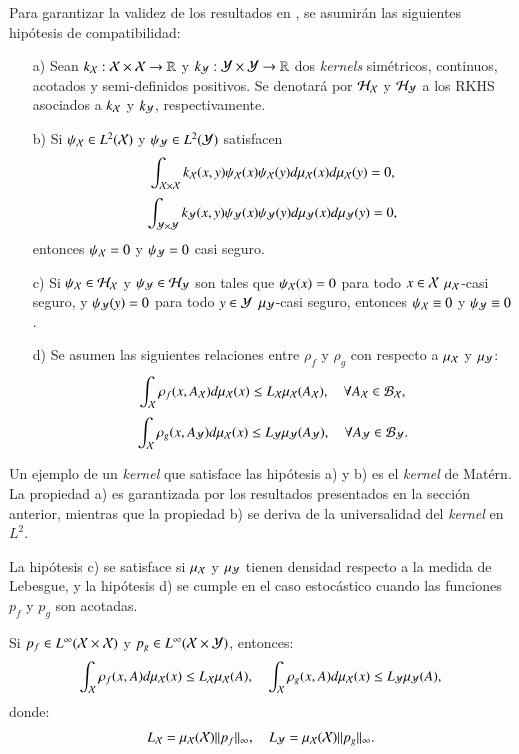 Para garantizar la validez de los resultados en \cite{Philipp2024ErrorOperator}, se asumirán las siguientes hipótesis de compatibilidad:
\begin{enumerate}
    \item[a)] Sean $k_{\mathcal{X}}:\mathcal{X} \times \mathcal{X} \to \mathbb{R}$ y $k_{\mathcal{Y}}: \mathcal{Y} \times \mathcal{Y} \to \mathbb{R}$ dos \textit{kernels} simétricos, continuos, acotados y semi-definidos positivos. Se denotará por $\mathcal{H}_{\mathcal{X}}$ y $\mathcal{H}_{\mathcal{Y}}$ a los RKHS asociados a $k_{\mathcal{X}}$ y $k_{\mathcal{Y}}$, respectivamente.
    
    \item[b)] Si $\psi_{\mathcal{X}} \in L^2(\mathcal{X})$ y $\psi_{\mathcal{Y}} \in L^2(\mathcal{Y})$ satisfacen  
    \[
        \int_{\mathcal{X} \times \mathcal{X}} k_{\mathcal{X}}(x,y) \psi_{\mathcal{X}} (x) \psi_{\mathcal{X}} (y) d \mu_{\mathcal{X}} (x) d \mu_{\mathcal{X}} (y) = 0, 
    \]
    \[
        \int_{\mathcal{Y} \times \mathcal{Y}} k_{\mathcal{Y}}(x,y) \psi_{\mathcal{Y}} (x) \psi_{\mathcal{Y}} (y) d \mu_{\mathcal{Y}} (x) d \mu_{\mathcal{Y}} (y) = 0, 
    \]
    entonces $\psi_{\mathcal{X}} = 0$ y $\psi_{\mathcal{Y}} = 0$ casi seguro.
    
    \item[c)] Si $\psi_{\mathcal{X}} \in \mathcal{H}_{\mathcal{X}}$ y $\psi_{\mathcal{Y}} \in \mathcal{H}_{\mathcal{Y}}$ son tales que $\psi_{\mathcal{X}}(x) = 0$ para todo $x \in \mathcal{X}$ $\mu_{\mathcal{X}}$-casi seguro, y $\psi_{\mathcal{Y}}(y) = 0$ para todo $y \in \mathcal{Y}$ $\mu_{\mathcal{Y}}$-casi seguro, entonces $\psi_{\mathcal{X}} \equiv 0$ y $\psi_{\mathcal{Y}} \equiv 0$.
    
    \item[d)] Se asumen las siguientes relaciones entre $\rho_f$ y $\rho_g$ con respecto a $\mu_{\mathcal{X}}$ y $\mu_{\mathcal{Y}}$:
    \[
        \int_{\mathcal{X}} \rho_f (x, A_{\mathcal{X}}) d\mu_{\mathcal{X}} (x) \leq L_{\mathcal{X}} \mu_{\mathcal{X}} (A_{\mathcal{X}}), \quad \forall A_{\mathcal{X}} \in \mathcal{B}_{\mathcal{X}},
    \]
    \[
        \int_{\mathcal{X}} \rho_g (x, A_{\mathcal{Y}}) d\mu_{\mathcal{X}} (x) \leq L_{\mathcal{Y}} \mu_{\mathcal{Y}} (A_{\mathcal{Y}}), \quad \forall A_{\mathcal{Y}} \in \mathcal{B}_{\mathcal{Y}}.
    \]
\end{enumerate}

Un ejemplo de un \textit{kernel} que satisface las hipótesis a) y b) es el \textit{kernel} de Matérn. La propiedad a) es garantizada por los resultados presentados en la sección anterior, mientras que la propiedad b) se deriva de la universalidad del \textit{kernel} en $L^2$. 

La hipótesis c) se satisface si $\mu_{\mathcal{X}}$ y $\mu_{\mathcal{Y}}$ tienen densidad respecto a la medida de Lebesgue, y la hipótesis d) se cumple en el caso estocástico cuando las funciones $p_f$ y $p_g$ son acotadas. 

\begin{prop}
    Si $p_f \in L^{\infty} (\mathcal{X} \times \mathcal{X})$ y $p_g \in L^{\infty} (\mathcal{X} \times \mathcal{Y})$, entonces:
    \[
        \int_{\mathcal{X}} \rho_f (x, A) d\mu_{\mathcal{X}} (x) \leq L_{\mathcal{X}} \mu_{\mathcal{X}} (A), \quad \int_{\mathcal{X}} \rho_g (x, A) d\mu_{\mathcal{X}} (x) \leq L_{\mathcal{Y}} \mu_{\mathcal{Y}} (A),
    \]
    donde:
    \[
        L_{\mathcal{X}} = \mu_{\mathcal{X}} (\mathcal{X}) \| p_f \|_\infty, \quad L_{\mathcal{Y}} = \mu_{\mathcal{X}} (\mathcal{X}) \| p_g \|_\infty.
    \]
\end{prop}

